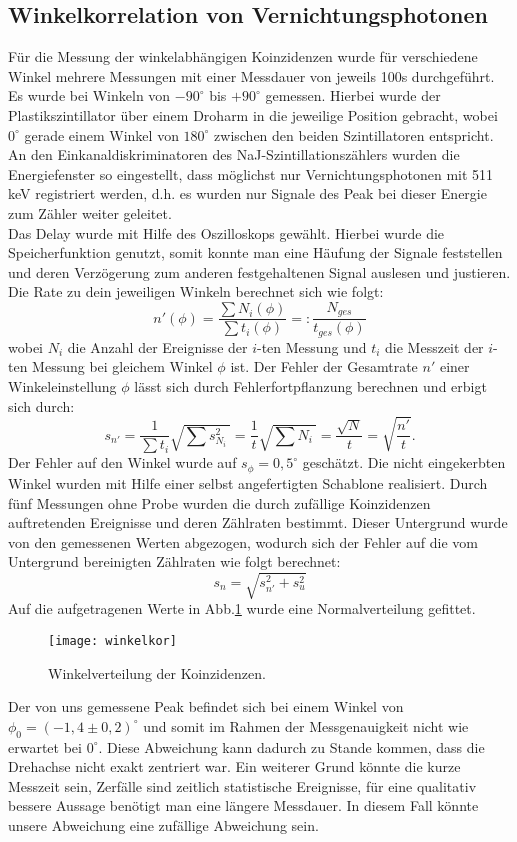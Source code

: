\clearpage
\subsection{Winkelkorrelation von Vernichtungsphotonen}
Für die Messung der winkelabhängigen Koinzidenzen wurde für verschiedene Winkel mehrere Messungen mit einer Messdauer von jeweils 100s durchgeführt. Es wurde bei Winkeln von $-90^{\circ}$ bis $+90^{\circ}$ gemessen. Hierbei wurde der Plastikszintillator über einem Droharm in die jeweilige Position gebracht, wobei $0^{\circ}$ gerade einem Winkel von $180^{\circ}$ zwischen den beiden Szintillatoren entspricht.\\
An den Einkanaldiskriminatoren des NaJ-Szintillationszählers wurden die Energiefenster so eingestellt, dass möglichst nur Vernichtungsphotonen mit 511 keV registriert werden, d.h. es wurden nur Signale des Peak bei dieser Energie zum Zähler weiter geleitet.\\
Das Delay wurde mit Hilfe des Oszilloskops gewählt. Hierbei wurde die Speicherfunktion genutzt, somit konnte man eine Häufung der Signale feststellen und deren Verzögerung zum anderen festgehaltenen Signal auslesen und justieren.\\
Die Rate zu dein jeweiligen Winkeln berechnet sich wie folgt:
\[ n'(\phi)=\frac{\sum N_i(\phi)}{\sum t_i(\phi)} =: \frac{N_{ges}}{t_{ges}(\phi)} \]
wobei $N_i$ die Anzahl der Ereignisse der $i$-ten Messung und $t_i$ die Messzeit der $i$-ten Messung bei gleichem Winkel $\phi$ ist. Der Fehler der Gesamtrate $n'$ einer Winkeleinstellung $\phi$ lässt sich durch Fehlerfortpflanzung berechnen und erbigt sich durch:
\[ s_{n'}=\frac{1}{\sum t_i} \sqrt{\sum s_{N_i}^2~} = \frac{1}{t} \sqrt{\sum N_i~} = \frac{\sqrt{N}}{t}=\sqrt{\frac{n'}{t}} .\]
Der Fehler auf den Winkel wurde auf $s_{\phi}=0,5^{\circ}$ geschätzt. Die nicht eingekerbten Winkel wurden mit Hilfe einer selbst angefertigten Schablone realisiert. Durch fünf Messungen ohne Probe wurden die durch zufällige Koinzidenzen auftretenden Ereignisse und deren Zählraten bestimmt. Dieser Untergrund wurde von den gemessenen Werten abgezogen, wodurch sich der Fehler auf die vom Untergrund bereinigten Zählraten wie folgt berechnet:
\[ s_n=\sqrt{s_{n'}^2+s_u^2} \]
Auf die aufgetragenen Werte in Abb.\ref{fig:winkelkor} wurde eine Normalverteilung gefittet. 

\begin{figure}[h]
\begin{center}
\texttt{[image: winkelkor]}
\caption{Winkelverteilung der Koinzidenzen.}
\label{fig:winkelkor}
\end{center}
\end{figure}

Der von uns gemessene Peak befindet sich bei einem Winkel von $\phi_0 = (-1,4\pm0,2)^{\circ}$ und somit im Rahmen der Messgenauigkeit nicht wie erwartet bei $0^{\circ}$. Diese Abweichung kann dadurch zu Stande kommen, dass die Drehachse nicht exakt zentriert war. Ein weiterer Grund könnte die kurze Messzeit sein, Zerfälle sind zeitlich statistische Ereignisse, für eine qualitativ bessere Aussage benötigt man eine längere Messdauer. In diesem Fall könnte unsere Abweichung eine zufällige Abweichung sein.